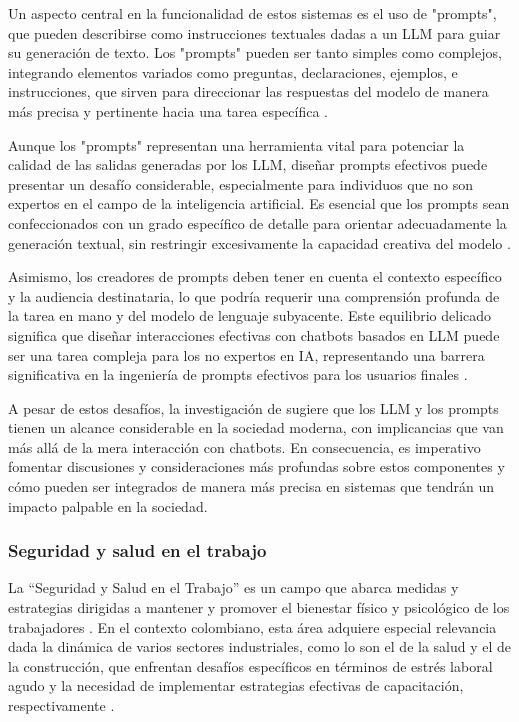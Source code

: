 Un aspecto central en la funcionalidad de estos sistemas es el uso de "prompts", que pueden describirse como instrucciones textuales dadas a un LLM para guiar su generación de texto. Los "prompts" pueden ser tanto simples como complejos, integrando elementos variados como preguntas, declaraciones, ejemplos, e instrucciones, que sirven para direccionar las respuestas del modelo de manera más precisa y pertinente hacia una tarea específica \citep{Zamfirescu-Pereira2023WhyPrompts}.

Aunque los "prompts" representan una herramienta vital para potenciar la calidad de las salidas generadas por los LLM, diseñar prompts efectivos puede presentar un desafío considerable, especialmente para individuos que no son expertos en el campo de la inteligencia artificial. Es esencial que los prompts sean confeccionados con un grado específico de detalle para orientar adecuadamente la generación textual, sin restringir excesivamente la capacidad creativa del modelo \citep{Zamfirescu-Pereira2023WhyPrompts}.

Asimismo, los creadores de prompts deben tener en cuenta el contexto específico y la audiencia destinataria, lo que podría requerir una comprensión profunda de la tarea en mano y del modelo de lenguaje subyacente. Este equilibrio delicado significa que diseñar interacciones efectivas con chatbots basados en LLM puede ser una tarea compleja para los no expertos en IA, representando una barrera significativa en la ingeniería de prompts efectivos para los usuarios finales \citep{Zamfirescu-Pereira2023WhyPrompts}.

 A pesar de estos desafíos, la investigación de \citet{Zamfirescu-Pereira2023WhyPrompts} sugiere que los LLM y los prompts tienen un alcance considerable en la sociedad moderna, con implicancias que van más allá de la mera interacción con chatbots. En consecuencia, es imperativo fomentar discusiones y consideraciones más profundas sobre estos componentes y cómo pueden ser integrados de manera más precisa en sistemas que tendrán un impacto palpable en la sociedad.


\subsubsection{Seguridad y salud en el trabajo}
La ``Seguridad y Salud en el Trabajo'' es un campo que abarca medidas y estrategias dirigidas a mantener y promover el bienestar físico y psicológico de los trabajadores \citep{Yaneth2021StrategiesSector,GonzalezDelgado2023AcuteStudy}. En el contexto colombiano, esta área adquiere especial relevancia dada la dinámica de varios sectores industriales, como lo son el de la salud y el de la construcción, que enfrentan desafíos específicos en términos de estrés laboral agudo y la necesidad de implementar estrategias efectivas de capacitación, respectivamente \citep{Yaneth2021StrategiesSector,GonzalezDelgado2023AcuteStudy}.

